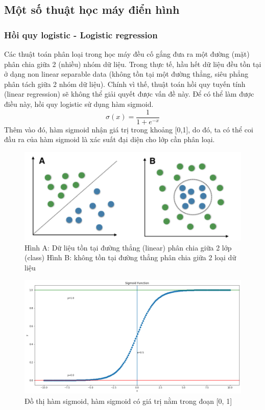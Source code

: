 \documentclass[../DoAn.tex]{subfiles}
\begin{document}
\subsection{Một số thuật học máy điển hình}
\subsubsection{Hồi quy logistic - Logistic regression}
Các thuật toán phân loại trong học máy đều cố gắng đưa ra một đường (mặt) phân chia giữa 2 (nhiều) nhóm dữ liệu. Trong thực tế, hầu hết dữ liệu đều tồn tại ở dạng non linear separable data (không tồn tại một đường thẳng, siêu phẳng phân tách giữa 2 nhóm dữ liệu). Chính vì thế, thuật toán hồi quy tuyến tính (linear regression) sẽ không thể giải quyết được vấn đề này. Để có thể làm được điều này, hồi quy logistic sử dụng hàm sigmoid.  \[\sigma (x)= \frac{1}{1+e^{-x}}\]Thêm vào đó, hàm sigmoid nhận giá trị trong khoảng [0,1], do đó, ta có thể coi đầu ra của hàm sigmoid là xác suất đại diện cho lớp cần phân loại.
\begin{figure}
    \centering
    \includegraphics[width=1\linewidth]{Hinh_ve/linear_sep.png}
    \caption{Hình A: Dữ liệu tồn tại đường thẳng (linear) phân chia giữa 2 lớp (class) Hình B: không tồn tại đường thẳng phân chia giữa 2 loại dữ liệu}
    \label{fig:hình1}
\end{figure}

\begin{figure}
    \centering
    \includegraphics[width=1\linewidth]{Hinh_ve/sigmoid_function.png}
    \caption{Đồ thị hàm sigmoid, hàm sigmoid có giá trị nằm trong đoạn [0, 1]}
    \label{fig:hình2}
\end{figure}
\end{document}
